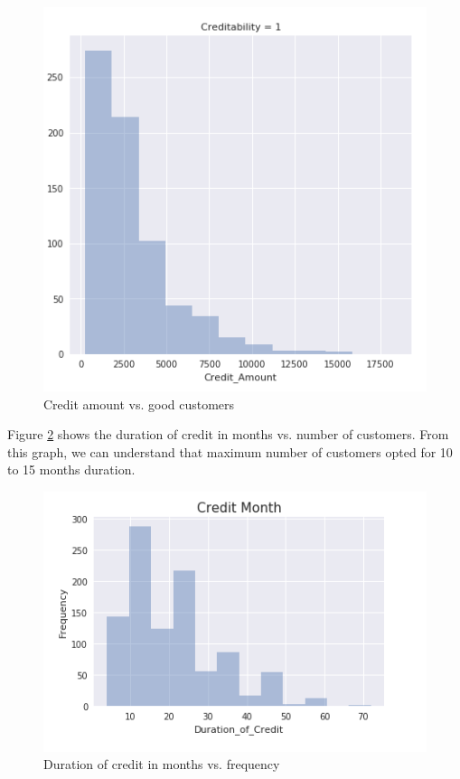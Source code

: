 \documentclass[sigconf]{acmart}
\begin{document}
\begin{figure}[htb]
  \centering
  \includegraphics[width=1.0\columnwidth]{images/Figure9.png}
  \caption{Credit amount vs. good customers}
  \label{fig:Figure9} 
\end{figure}

Figure \ref{fig:Figure10} shows the duration of credit in months vs. number of customers. From this graph, we can understand that maximum number of customers opted for 10 to 15 months duration.

\begin{figure}[htb]
  \centering
  \includegraphics[width=1.0\columnwidth]{images/Figure10.png}
  \caption{Duration of credit in months vs. frequency}
  \label{fig:Figure10}
\end{figure}
\end{document}
